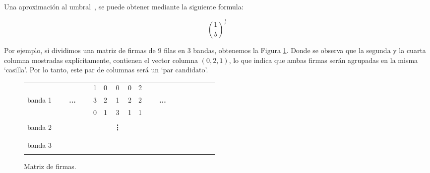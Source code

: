 Una aproximación al umbral~\cite{Rajaraman:2011:MMD:2124405}, se puede obtener mediante la siguiente formula:

\begin{equation*}
 (\frac{1}{b})^{\frac{1}{r}}
\end{equation*}

Por ejemplo, si dividimos una matriz de firmas de $9$ filas en $3$ bandas,
obtenemos la Figura \ref{tab:conjuntoejemplo3}.
Donde se observa que la segunda y la cuarta columna mostradas explícitamente,
contienen el vector columna $(0, 2, 1)$,
lo que indica que ambas firmas serán agrupadas en la misma ‘casilla’.
Por lo tanto, este par de columnas será un ‘par candidato’.

\begin{figure}[h]
\small
\centering
\begin{tabular}{c|cccccccccccccccccccc|}
\cline{2-21}
			& & & & & & 1 & 0 & 0 & 0 & 2 & & & & & & & & & & \\
banda 1	    & \multicolumn{5}{c}{\textbf{...}} & 3 & 2 & 1 & 2 & 2 & \multicolumn{5}{c}{\textbf{...}} & & & & & \\
			& & & & & & 0 & 1 & 3 & 1 & 1 & & & & & & & & & & \\
\cline{2-21}
			& & & & & & & & & & & & & & & & & & & & \\
banda 2	    & & & & & & & & \textbf{\vdots} & & & & & & & & & & & & \\
			& & & & & & & & & & & & & & & & & & & & \\
\cline{2-21}
			& & & & & & & & & & & & & & & & & & & & \\
banda 3     & & & & & & & & & & & & & & & & & & & & \\
			& & & & & & & & & & & & & & & & & & & & \\
\cline{2-21}
\end{tabular}
\caption{Matriz de firmas.}
\label{tab:conjuntoejemplo3}
\end{figure}